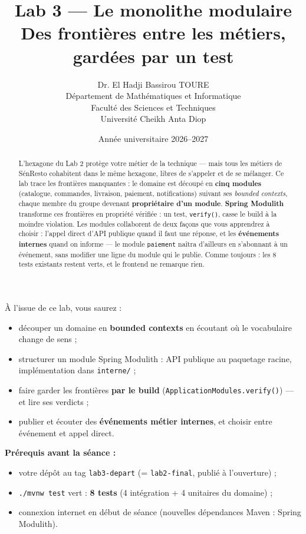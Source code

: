 \documentclass[a4paper,11pt]{article}
\title{\textcolor{titlecolor}{\Huge\textbf{Lab 3 --- Le monolithe modulaire}}\\[0.5em]
       \textcolor{sectitlecolor}{\LARGE Des frontières entre les métiers, gardées par un test}}
\author{Dr. El Hadji Bassirou TOURE\\
        Département de Mathématiques et Informatique\\
        Faculté des Sciences et Techniques\\
        Université Cheikh Anta Diop}
\date{Année universitaire 2026--2027}
\begin{document}
\maketitle
\thispagestyle{empty}

\begin{abstract}
\noindent L'hexagone du Lab 2 protège votre métier de la technique --- mais
tous les métiers de SénResto cohabitent dans le même hexagone, libres de
s'appeler et de se mélanger. Ce lab trace les frontières manquantes : le
domaine est découpé en \textbf{cinq modules} (catalogue, commandes,
livraison, paiement, notifications) suivant ses \emph{bounded contexts},
chaque membre du groupe devenant \textbf{propriétaire d'un module}.
\textbf{Spring Modulith} transforme ces frontières en propriété vérifiée :
un test, \texttt{verify()}, casse le build à la moindre violation. Les
modules collaborent de deux façons que vous apprendrez à choisir : l'appel
direct d'API publique quand il faut une réponse, et les \textbf{événements
internes} quand on informe --- le module \texttt{paiement} naîtra d'ailleurs
en s'abonnant à un événement, sans modifier une ligne du module qui le
publie. Comme toujours : les 8 tests existants restent verts, et le
frontend ne remarque rien.
\end{abstract}

\begin{benefitbox}
À l'issue de ce lab, vous saurez :
\begin{itemize}[nosep]
  \item découper un domaine en \textbf{bounded contexts} en écoutant où le
        vocabulaire change de sens ;
  \item structurer un module Spring Modulith : API publique au paquetage
        racine, implémentation dans \texttt{interne/} ;
  \item faire garder les frontières \textbf{par le build}
        (\texttt{ApplicationModules.verify()}) --- et lire ses verdicts ;
  \item publier et écouter des \textbf{événements métier internes}, et
        choisir entre événement et appel direct.
\end{itemize}
\end{benefitbox}

\begin{warningbox}
\textbf{Prérequis avant la séance :}
\begin{itemize}[nosep]
  \item votre dépôt au tag \texttt{lab3-depart} (= \texttt{lab2-final},
        publié à l'ouverture) ;
  \item \texttt{./mvnw test} vert : \textbf{8 tests} (4 intégration +
        4 unitaires du domaine) ;
  \item connexion internet en début de séance (nouvelles dépendances
        Maven : Spring Modulith).
\end{itemize}
\end{warningbox}
\end{document}
